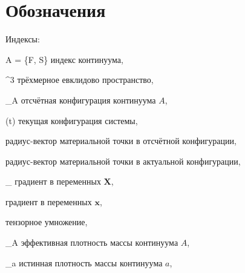 \section*{Обозначения}
\setcounter{subsection}{0}
	
	Индексы:
\begin{where}
	\item [A = \{F, S\}] индекс континуума,
\end{where}

\begin{where}
	\item [\mathbb{E}^3] трёхмерное евклидово пространство,
	\item [\kappa_A] отсчётная конфигурация континуума $A$,
	\item [\chi(t)] текущая конфигурация системы,
	\item [\mathbf{X}] радиус-вектор материальной точки в отсчётной конфигурации,
	\item [\mathbf{x}] радиус-вектор материальной точки в актуальной конфигурации,
	\item [\nabla_{\kappa}] градиент в переменных $\mathbf{X}$,
	\item [\nabla] градиент в переменных $\mathbf{x}$,
	\item [\otimes] тензорное умножение,
	\item [\rho_A] эффективная плотность массы континуума $A$,
	\item [\rho_a] истинная плотность массы континуума $a$,
\end{where}
